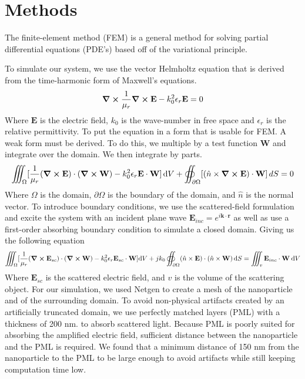 \documentclass{article}
\begin{document}
\section{Methods}
    The finite-element method (FEM) is a general method for solving partial differential equations (PDE's) based off of the variational principle. 

    To simulate our system, we use the vector Helmholtz equation that is derived from the time-harmonic form of Maxwell's equations. 
    \begin{equation}
        \curl \frac{1}{\mu_r}\curl \textbf{E} - k_0^2\epsilon_r\textbf{E} = 0
    \end{equation}
    Where \(\textbf{E}\) is the electric field, \(k_0\) is the wave-number in free space and \(\epsilon_r\) is the relative permittivity. To put the equation in a form that is usable for FEM. A weak form must be derived. To do this, we multiple by a test function \(\textbf{W}\) and integrate over the domain. We then integrate by parts. \cite{jinFiniteElementMethod2014,jinFiniteElementAnalysis2009,volakisReviewFiniteelementMethod1994}
    \begin{equation}
        \iiint_\Omega [\frac{1}{\mu_r}(\curl \textbf{E}) \cdot (\curl \textbf{W}) - k_0^2 \epsilon_r \textbf{E} \cdot \textbf{W}]\, \mathrm{d}V + \oiint_{\partial\Omega} [(\hat{n}\times\curl \textbf{E}) \cdot \textbf{W}]\, dS= 0
    \end{equation}
    Where \(\Omega\) is the domain, \(\partial\Omega\) is the boundary of the domain, and \(\hat{n}\) is the normal vector. To introduce boundary conditions, we use the scattered-field formulation and excite the system with an incident plane wave \(\textbf{E}_{inc} = e^{i\textbf{k} \cdot \textbf{r}}\) as well as use a first-order absorbing boundary condition to simulate a closed domain. \cite{jinFiniteElementMethod2014} Giving us the following equation
    \begin{equation}
        \iiint_\Omega [\frac{1}{\mu_r}(\curl \textbf{E}_{sc}) \cdot (\curl \textbf{W}) - k_0^2 \epsilon_r \textbf{E}_{sc} \cdot \textbf{W}]\mathrm{d}V + jk_0 \oiint_{\partial \Omega} (\hat{n} \times \textbf{E}) \cdot (\hat{n} \times \textbf{W})\, \mathrm{d}S = \iiint_v \textbf{E}_{inc} \cdot \textbf{W}\: \mathrm{d}V
    \end{equation}
    Where \(\textbf{E}_{sc}\) is the scattered electric field, and \(v\) is the volume of the scattering object. For our simulation, we used Netgen to create a mesh of the nanoparticle and of the surrounding domain. To avoid non-physical artifacts created by an artificially truncated domain, we use perfectly matched layers (PML) with a thickness of 200 nm. to absorb scattered light. Because PML is poorly suited for absorbing the amplified electric field, sufficient distance between the nanoparticle and the PML is required. We found that a minimum distance of 150 nm from the nanoparticle to the PML to be large enough to avoid artifacts while still keeping computation time low. 
\end{document}
